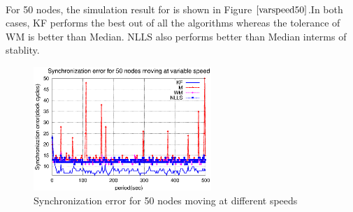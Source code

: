 \documentclass[a4paper,10pt]{report}
\begin{document}
\paragraph*{}
For 50 nodes, the simulation result for is shown in Figure $\ref{varspeed50}$.In both cases, KF performs the best out of all the algorithms whereas the tolerance of WM is better than Median. NLLS also performs better than Median interms of stablity.
\begin{figure}
 \centering
 \includegraphics[width=0.6\textwidth]{varspeed50}
 \caption{Synchronization error for 50 nodes moving at different speeds}
 \label{varspeed50}
\end{figure}
\end{document}
